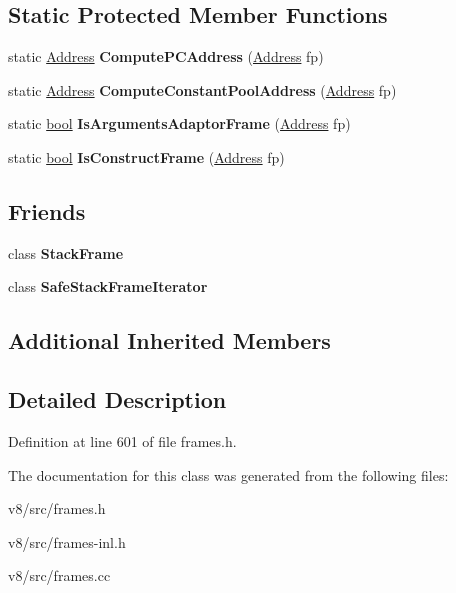 \subsection*{Static Protected Member Functions}
\begin{DoxyCompactItemize}
\item 
\mbox{\label{classv8_1_1internal_1_1StandardFrame_aeff1e57ce047c0318f1f8260c9680c7b}} 
static \mbox{\hyperlink{classuintptr__t}{Address}} {\bfseries Compute\+P\+C\+Address} (\mbox{\hyperlink{classuintptr__t}{Address}} fp)
\item 
\mbox{\label{classv8_1_1internal_1_1StandardFrame_a3f8156bbb0acef720b9123a7c0e34bfc}} 
static \mbox{\hyperlink{classuintptr__t}{Address}} {\bfseries Compute\+Constant\+Pool\+Address} (\mbox{\hyperlink{classuintptr__t}{Address}} fp)
\item 
\mbox{\label{classv8_1_1internal_1_1StandardFrame_a43bc4f67c3fdff50657cc93e0d83f0a4}} 
static \mbox{\hyperlink{classbool}{bool}} {\bfseries Is\+Arguments\+Adaptor\+Frame} (\mbox{\hyperlink{classuintptr__t}{Address}} fp)
\item 
\mbox{\label{classv8_1_1internal_1_1StandardFrame_afc0b10707c929797c6e3448714e73bbf}} 
static \mbox{\hyperlink{classbool}{bool}} {\bfseries Is\+Construct\+Frame} (\mbox{\hyperlink{classuintptr__t}{Address}} fp)
\end{DoxyCompactItemize}
\subsection*{Friends}
\begin{DoxyCompactItemize}
\item 
\mbox{\label{classv8_1_1internal_1_1StandardFrame_a97d8ed08ddcf9dcc973f7e29b74a992f}} 
class {\bfseries Stack\+Frame}
\item 
\mbox{\label{classv8_1_1internal_1_1StandardFrame_aa1c3e6274807549ee11be5be6cd1ae62}} 
class {\bfseries Safe\+Stack\+Frame\+Iterator}
\end{DoxyCompactItemize}
\subsection*{Additional Inherited Members}


\subsection{Detailed Description}


Definition at line 601 of file frames.\+h.



The documentation for this class was generated from the following files\+:\begin{DoxyCompactItemize}
\item 
v8/src/frames.\+h\item 
v8/src/frames-\/inl.\+h\item 
v8/src/frames.\+cc\end{DoxyCompactItemize}
